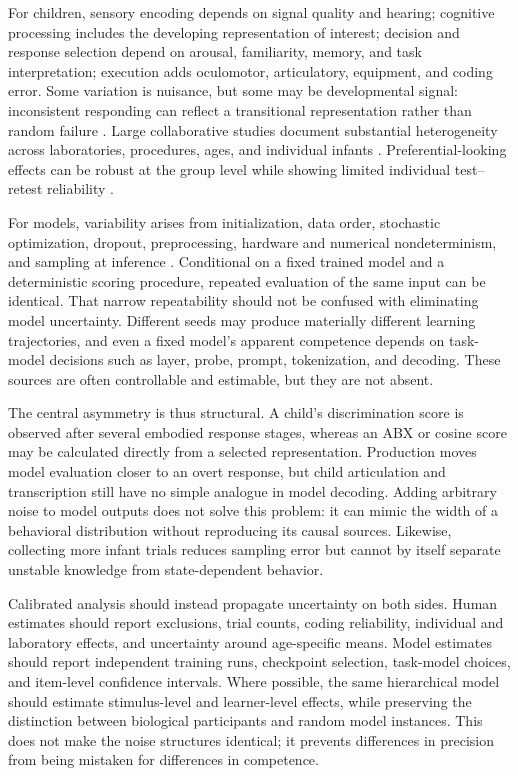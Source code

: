 For children, sensory encoding depends on signal quality and hearing; cognitive processing includes the developing representation of interest; decision and response selection depend on arousal, familiarity, memory, and task interpretation; execution adds oculomotor, articulatory, equipment, and coding error. Some variation is nuisance, but some may be developmental signal: inconsistent responding can reflect a transitional representation rather than random failure \citep{Mitchell2022,kucharsky2024habituation}. Large collaborative studies document substantial heterogeneity across laboratories, procedures, ages, and individual infants \citep{ManyBabies2020}. Preferential-looking effects can be robust at the group level while showing limited individual test--retest reliability \citep{Monroy2021,DeBolt2020,byers2022six,schreiner2024limited}.

For models, variability arises from initialization, data order, stochastic optimization, dropout, preprocessing, hardware and numerical nondeterminism, and sampling at inference \citep{Srivastava2014,dodge2020fine,summers2021nondeterminism}. Conditional on a fixed trained model and a deterministic scoring procedure, repeated evaluation of the same input can be identical. That narrow repeatability should not be confused with eliminating model uncertainty. Different seeds may produce materially different learning trajectories, and even a fixed model's apparent competence depends on task-model decisions such as layer, probe, prompt, tokenization, and decoding. These sources are often controllable and estimable, but they are not absent.

The central asymmetry is thus structural. A child's discrimination score is observed after several embodied response stages, whereas an ABX or cosine score may be calculated directly from a selected representation. Production moves model evaluation closer to an overt response, but child articulation and transcription still have no simple analogue in model decoding. Adding arbitrary noise to model outputs does not solve this problem: it can mimic the width of a behavioral distribution without reproducing its causal sources. Likewise, collecting more infant trials reduces sampling error but cannot by itself separate unstable knowledge from state-dependent behavior.

Calibrated analysis should instead propagate uncertainty on both sides. Human estimates should report exclusions, trial counts, coding reliability, individual and laboratory effects, and uncertainty around age-specific means. Model estimates should report independent training runs, checkpoint selection, task-model choices, and item-level confidence intervals. Where possible, the same hierarchical model should estimate stimulus-level and learner-level effects, while preserving the distinction between biological participants and random model instances. This does not make the noise structures identical; it prevents differences in precision from being mistaken for differences in competence.


